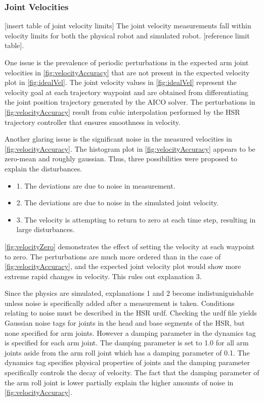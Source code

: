 \documentclass[12pt]{article}
\begin{document}
        \subsubsection{Joint Velocities}
            [insert table of joint velocity limits]
            The joint velocity measurements fall within velocity limits for both the physical robot and simulated robot. [reference limit table]. 
            \par One issue is the prevalence of periodic perturbations in the expected arm joint velocities in \autoref{fig:velocityAccuracy} that are not present in the expected velocity plot in \autoref{fig:idealVel}. The joint velocity values in \autoref{fig:idealVel} represent the velocity goal at each trajectory waypoint and are obtained from differentiating the joint position trajectory generated by the AICO solver. The perturbations in \autoref{fig:velocityAccuracy} result from cubic interpolation performed by the HSR trajectory controller that ensures smoothness in velocity.

            \par Another glaring issue is the significant noise in the measured velocities in \autoref{fig:velocityAccuracy}. The histogram plot in \autoref{fig:velocityAccuracy} appears to be zero-mean and roughly gaussian. Thus, three possibilities were proposed to explain the disturbances.
            \begin{itemize}
                \item 1. The deviations are due to noise in measurement.
                \item 2. The deviations are due to noise in the simulated joint velocity.
                \item 3. The velocity is attempting to return to zero at each time step, resulting in large disturbances.
            \end{itemize}

            \autoref{fig:velocityZero} demonstrates the effect of setting the velocity at each waypoint to zero. The perturbations are much more ordered than in the case of \autoref{fig:velocityAccuracy}, and the expected joint velocity plot would show more extreme rapid changes in velocity. This rules out explanation 3. 

            \par Since the physics are simulated, explanations 1 and 2 become indistuniguishable unless noise is specifically added after a measurement is taken. Conditions relating to noise must be described in the HSR urdf. Checking the urdf file yields Gaussian noise tags for joints in the head and base segments of the HSR, but none specified for arm joints. However a damping parameter in the dynamics tag is specified for each arm joint. The damping parameter is set to 1.0 for all arm joints aside from the arm roll joint which has a damping parameter of 0.1. The dynamics tag specifies physical properties of joints and the damping parameter specifically controls the decay of velocity. The fact that the damping parameter of the arm roll joint is lower partially explain the higher amounts of noise in \autoref{fig:velocityAccuracy}.
\end{document}

